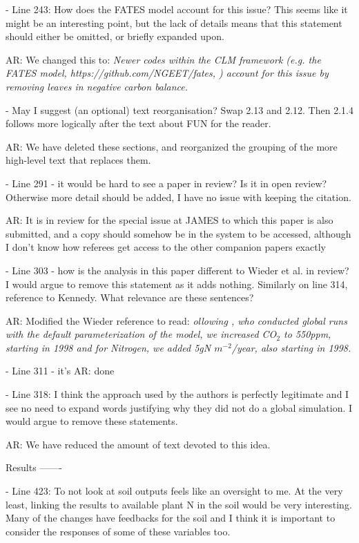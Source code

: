 \documentclass{article}
\begin{document}
- Line 243: How does the FATES model account for this issue? This seems like it might be an interesting point, but the lack of details means that this statement should either be omitted, or briefly expanded upon.

\textsf{AR: We changed this to: \emph{Newer codes within the CLM framework (e.g. the FATES model, https://github.com/NGEET/fates, \cite{fisher2015}) account for this issue by removing leaves in negative carbon balance.}}

- May I suggest (an optional) text reorganisation? Swap 2.13 and 2.12. Then 2.1.4 follows more logically after the text about FUN for the reader. 

\textsf{AR: We have deleted these sections, and reorganized the grouping of the more high-level text that replaces them.}

- Line 291 - it would be hard to see a paper in review? Is it in open review? Otherwise more detail should be added, I have no issue with keeping the citation. 

\textsf{AR: It is in review for the special issue at JAMES to which this paper is also submitted, and a copy should somehow be in the system to be accessed, although I don't know how referees get access to the other companion papers exactly}

- Line 303 - how is the analysis in this paper different to Wieder et al. in review? I would argue to remove this statement as it adds nothing. Similarly on line 314, reference to Kennedy. What relevance are these sentences? 

\textsf{AR: Modified the Wieder reference to read: \emph{ollowing \cite{wieder2019}, who conducted global runs with the default parameterization of the model, we increased CO$_{2}$ to 550ppm, starting in 1998 and for Nitrogen, we added 5gN $m^{-2}$/year, also starting in 1998.}}

- Line 311 - it's 
\textsf{AR: done}

- Line 318: I think the approach used by the authors is perfectly legitimate and I see no need to expand words justifying why they did not do a global simulation. I would argue to remove these statements. 

AR: \textsf{We have reduced the amount of text devoted to this idea.}

Results 
------- 

- Line 423: To not look at soil outputs feels like an oversight to me. At the very least, linking the results to available plant N in the soil would be very interesting. Many of the changes have feedbacks for the soil and I think it is important to consider the responses of some of these variables too. 
\end{document}

